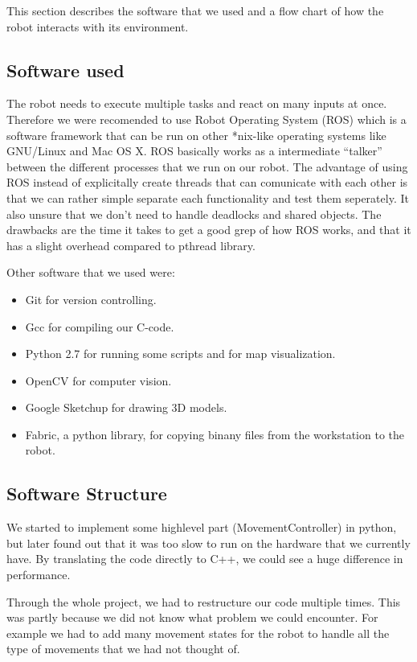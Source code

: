 This section describes the software that we used and a flow chart of how the robot interacts with its environment.

\subsection{Software used}
The robot needs to execute multiple tasks and react on many inputs at once. Therefore we were recomended to use Robot Operating System (ROS) which is a software framework that can be run on other *nix-like operating systems like GNU/Linux and Mac OS X. ROS basically works as a intermediate ``talker'' between the different processes that we run on our robot. The advantage of using ROS instead of explicitally create threads that can comunicate with each other is that we can rather simple separate each functionality and test them seperately. It also unsure that we don't need to handle deadlocks and shared objects. The drawbacks are the time it takes to get a good grep of how ROS works, and that it has a slight overhead compared to pthread library.

Other software that we used were:
\begin{itemize}
\item Git for version controlling.
\item Gcc for compiling our C-code.
\item Python 2.7 for running some scripts and for map visualization.
\item OpenCV for computer vision.
\item Google Sketchup for drawing 3D models.
\item Fabric, a python library, for copying binany files from the workstation to the robot.
\end{itemize}

\subsection{Software Structure}
We started to implement some highlevel part (MovementController) in python, but later found out that it was too slow to run on the hardware that we currently have. By translating the code directly to C++, we could see a huge difference in performance.

Through the whole project, we had to restructure our code multiple times. This was partly because we did not know what problem we could encounter. For example we had to add many movement states for the robot to handle all the type of movements that we had not thought of.

